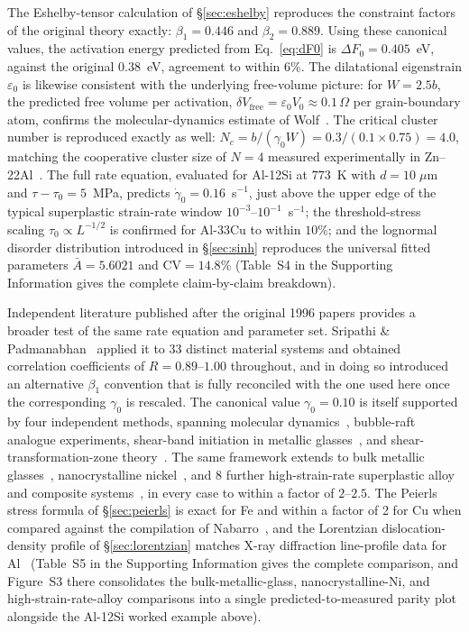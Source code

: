 \documentclass[5p,sort&compress]{elsarticle}
\newcommand{\dF}{\Delta F_0}
\newcommand{\gz}{\gamma_0}
\begin{document}
The Eshelby-tensor calculation of \S\ref{sec:eshelby} reproduces the
constraint factors of the original theory exactly: $\beta_1=0.446$
and $\beta_2=0.889$. Using these canonical values, the activation
energy predicted from Eq.~\eqref{eq:dF0} is $\dF=0.405$~eV, against
the original $0.38$~eV, agreement to within 6\%. The dilatational
eigenstrain $\varepsilon_0$ is likewise consistent with the
underlying free-volume picture: for $W=2.5b$, the predicted free
volume per activation, $\delta V_\text{free}=\varepsilon_0
V_0\approx0.1\,\Omega$ per grain-boundary atom, confirms the
molecular-dynamics estimate of Wolf~\cite{wolf1990}. The critical
cluster number is reproduced exactly as well: $N_c=b/(\gz
W)=0.3/(0.1\times0.75)=4.0$, matching the cooperative cluster size
of $N=4$ measured experimentally in Zn--22Al~\cite{astanin-part2}.
The full rate equation, evaluated for Al-12Si at $773$~K with
$d=10\;\mu$m and $\tau-\tau_0=5$~MPa, predicts
$\dot\gz=0.16$~s$^{-1}$, just above the upper edge of the typical
superplastic strain-rate window $10^{-3}$--$10^{-1}$~s$^{-1}$; the
threshold-stress scaling $\tau_0\propto L^{-1/2}$ is confirmed for
Al-33Cu to within $10\%$; and the lognormal disorder distribution
introduced in \S\ref{sec:sinh} reproduces the universal fitted
parameters $\bar A=5.6021$ and $\mathrm{CV}=14.8\%$ (Table~S4 in the
Supporting Information gives the complete claim-by-claim breakdown).

Independent literature published after the original 1996 papers
provides a broader test of the same rate equation and parameter
set. Sripathi \& Padmanabhan~\cite{sripathi2014} applied it to 33
distinct material systems and obtained correlation coefficients of
$R=0.89$--$1.00$ throughout, and in doing so introduced an
alternative $\beta_1$ convention that is fully reconciled with the
one used here once the corresponding $\gz$ is rescaled. The canonical
value $\gz=0.10$ is itself supported by four independent methods,
spanning molecular dynamics~\cite{wolf1990}, bubble-raft analogue
experiments, shear-band initiation in metallic
glasses~\cite{argon1979}, and shear-transformation-zone
theory~\cite{falk-langer1998}. The same framework extends to bulk
metallic glasses~\cite{buenz2015}, nanocrystalline
nickel~\cite{pad2018}, and 8 further high-strain-rate superplastic
alloy and composite systems~\cite{padbasariya2009}, in every case to
within a factor of $2$--$2.5$. The Peierls stress formula of
\S\ref{sec:peierls} is exact for Fe and within a factor of 2 for Cu
when compared against the compilation of
Nabarro~\cite{nabarro1997}, and the Lorentzian dislocation-density
profile of \S\ref{sec:lorentzian} matches X-ray diffraction
line-profile data for Al~\cite{vermeulen1995} (Table~S5 in the
Supporting Information gives the complete comparison, and
Figure~S3 there consolidates the bulk-metallic-glass,
nanocrystalline-Ni, and high-strain-rate-alloy comparisons into a
single predicted-to-measured parity plot alongside the Al-12Si worked
example above).
\end{document}
